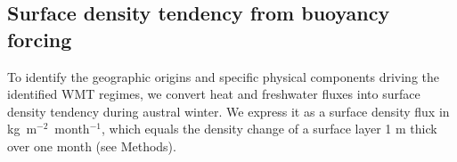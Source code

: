 \documentclass[pdflatex,sn-nature]{sn-jnl}
\begin{document}




\subsection{Surface density tendency from buoyancy forcing}

To identify the geographic origins and specific physical components driving the identified WMT regimes, we convert heat and freshwater fluxes into surface density tendency during austral winter. We express it as a surface density flux in kg~m$^{-2}$~month$^{-1}$, which equals the density change of a surface layer 1 m thick over one month (see Methods).
\end{document}
